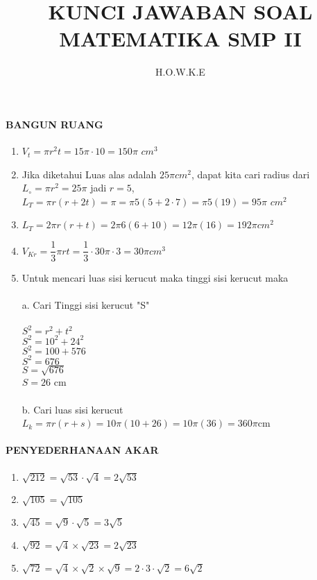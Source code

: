 \documentclass[12pt,a4paper]{article}
\author{H.O.W.K.E}
\title{KUNCI JAWABAN SOAL MATEMATIKA SMP II}
\begin{document}
	\maketitle
	\paragraph{BANGUN RUANG}
	\begin{enumerate}
		\item $V_t=\pi r^2 t=15\pi \cdot 10 = 150 \pi $ $cm^3$
		\item Jika diketahui Luas alas adalah $25\pi cm^2$, dapat kita cari radius dari  $L_\circ=\pi r^2=25\pi$ jadi $r=5$,  $L_T=\pi r(r+2t)=\pi = \pi 5(5+2 \cdot 7)=\pi 5(19)=95\pi$ $cm^2$
		\item $L_T=2\pi r(r+t)=2\pi 6(6+10)=12\pi(16)=192\pi cm^2$
		\item $V_{Kr}=\dfrac{1}{3}\pi r t = \dfrac{1}{3}\cdot 30\pi \cdot 3=30\pi cm^3$
		\item Untuk mencari luas sisi kerucut maka 
		tinggi sisi kerucut maka\\
		\\
		a. Cari Tinggi sisi kerucut "S"\\
		\\
		$S^2=r^2+t^2$
		\\
		$S^2=10^2+24^2$
		\\
		$S^2=100+576$
		\\
		$S^2=676$
		\\
		$S=\sqrt{676}$
		\\
		$S=26$ cm\\
		\\
		b. Cari luas sisi kerucut \\
		
		$L_k=\pi r(r+s)=10\pi(10+26)=10\pi(36)=360\pi$cm
		 
	\end{enumerate}

	\paragraph{PENYEDERHANAAN AKAR}
	\begin{enumerate}
		\item $\sqrt{212}=\sqrt{53} \cdot \sqrt{4}=2\sqrt{53}$
		\item $\sqrt{105}=\sqrt{105}$
		\item $\sqrt{45}=\sqrt{9}\cdot \sqrt{5}=3\sqrt{5}$
		\item $\sqrt{92}=\sqrt{4}\times \sqrt{23}=2\sqrt{23}$
		\item $\sqrt{72}=\sqrt{4}\times \sqrt{2}\times \sqrt{9}= 2\cdot 3\cdot \sqrt{2}=6\sqrt{2}$
	\end{enumerate}
	
\end{document}
